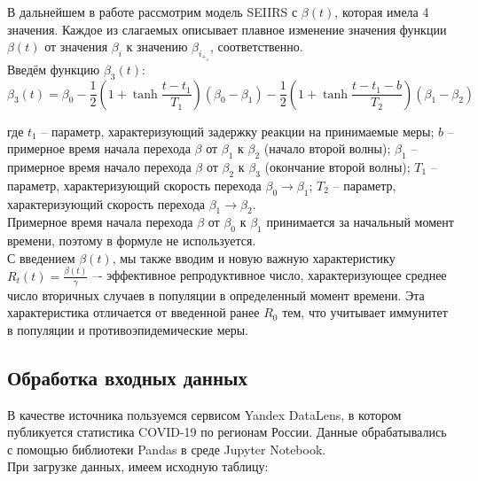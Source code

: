 \documentclass{article}
\begin{document}
\noindent В дальнейшем в работе рассмотрим модель SEIIRS с $\beta(t)$, которая имела 4 значения. Каждое из слагаемых описывает плавное изменение значения функции $\beta(t)$ от значения $\beta_i$ к значению $\beta_i_+_1$, соответственно.\\

\noindent Введём функцию $\beta_3(t)$:
$$\beta_3(t) = \beta_0 - \frac{1}{2} \left(1 + \tanh{\frac{t-t_1}{T_1}} \right)(\beta_0-\beta_1) - \frac{1}{2} \left(1 + \tanh{\frac{t-t_1-b}{T_2}} \right)(\beta_1-\beta_2)$$

\noindent где $t_1$ -- параметр, характеризующий задержку реакции на принимаемые меры; $b$ -- примерное время начала перехода $\beta$ от $\beta_1$ к $\beta_2$ (начало второй волны); $\beta_1$ -- примерное время начало перехода $\beta$ от $\beta_2$ к $\beta_3$ (окончание второй волны); $T_1$ -- параметр, характеризующий скорость перехода $\beta_0 \rightarrow \beta_1$; $T_2$ -- параметр, характеризующий скорость перехода $\beta_1 \rightarrow \beta_2$.\\

\noindent Примерное время начала перехода $\beta$ от $\beta_0$ к $\beta_1$ принимается за начальный момент времени, поэтому в формуле не используется.\\

\noindent С введением $\beta(t)$, мы также вводим и новую важную характеристику $R_t(t)=\frac{\beta(t)}{\gamma}$ –- эффективное репродуктивное число, характеризующее среднее число вторичных случаев в популяции в определенный момент времени. Эта характеристика отличается от введенной ранее $R_0$ тем, что учитывает иммунитет в популяции и противоэпидемические меры.

\subsection{Обработка входных данных}

\noindent В качестве источника пользуемся сервисом Yandex DataLens, в котором публикуется статистика COVID-19 по регионам России. Данные обрабатывались с помощью библиотеки Pandas в среде Jupyter Notebook.\\

\noindent При загрузке данных, имеем исходную таблицу: 

\begin{figure}[H]
	\label{fig:image}
\end{figure}
\end{document}

